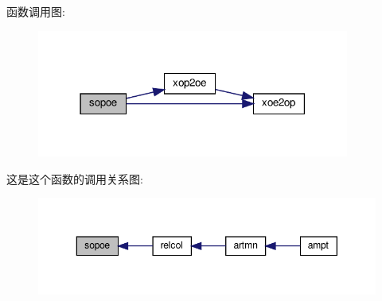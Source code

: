 函数调用图\+:
\nopagebreak
\begin{figure}[H]
\begin{center}
\leavevmode
\includegraphics[width=291pt]{sopoe_8f90_afebe74f4939fed579cd50b895c3c7b66_cgraph}
\end{center}
\end{figure}
这是这个函数的调用关系图\+:
\nopagebreak
\begin{figure}[H]
\begin{center}
\leavevmode
\includegraphics[width=350pt]{sopoe_8f90_afebe74f4939fed579cd50b895c3c7b66_icgraph}
\end{center}
\end{figure}
